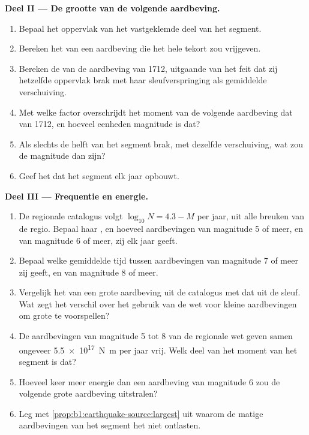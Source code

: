 \begin{problem}
\medskip
\noindent\textbf{Deel II --- De grootte van de volgende aardbeving.}
\begin{enumerate}[resume]
  \item Bepaal het oppervlak van het vastgeklemde deel van het segment.
  \item Bereken het  van een aardbeving die het hele tekort zou vrijgeven.
  \item Bereken de  van de aardbeving van 1712, uitgaande van het feit dat zij hetzelfde oppervlak brak met haar sleufverspringing als gemiddelde verschuiving.
  \item Met welke factor overschrijdt het moment van de volgende aardbeving dat van 1712, en hoeveel eenheden magnitude is dat?
  \item Als slechts de helft van het segment brak, met dezelfde verschuiving, wat zou de magnitude dan zijn?
  \item Geef het  dat het segment elk jaar opbouwt.
\end{enumerate}

\medskip
\noindent\textbf{Deel III --- Frequentie en energie.}
\begin{enumerate}[resume]
  \item De regionale catalogus volgt $\log_{10} N = 4.3 - M$ per jaar, uit alle breuken van de regio. Bepaal haar , en hoeveel aardbevingen van magnitude 5 of meer, en van magnitude 6 of meer, zij elk jaar geeft.
  \item Bepaal welke gemiddelde tijd tussen aardbevingen van magnitude 7 of meer zij geeft, en van magnitude 8 of meer.
  \item Vergelijk het  van een grote aardbeving uit de catalogus met dat uit de sleuf. Wat zegt het verschil over het gebruik van de wet voor kleine aardbevingen om grote te voorspellen?
  \item De aardbevingen van magnitude 5 tot 8 van de regionale wet geven samen ongeveer \qty{5.5e17}{N.m} per jaar vrij. Welk deel van het moment van het segment is dat?
  \item Hoeveel keer meer energie dan een aardbeving van magnitude 6 zou de volgende grote aardbeving uitstralen?
  \item Leg met \cref{prop:b1:earthquake-source:largest} uit waarom de matige aardbevingen van het segment het niet ontlasten.
\end{enumerate}


\end{problem}
